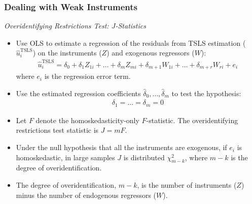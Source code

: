 \begin{frame}
\frametitle{Dealing with Weak Instruments}
\emph{Overidentifying Restrictions Test: $J$-Statistics}
\begin{itemize}
\item Use OLS to estimate a regression of the residuals from TSLS estimation ($\hat{u}^{\text{TSLS}}_{i}$) on the instruments ($Z$) and exogenous regressors ($W$):
\begin{align*}
\hat{u}^{\text{TSLS}}_{i} 
= \delta_{0} + \delta_{1}Z_{1i} + \ldots + \delta_{m}Z_{mi} + \delta_{m+1}W_{1i} + \ldots + \delta_{m+r}W_{ri} + e_{i}
\end{align*}
where $e_{i}$ is the regression error term. 
\item Use the estimated regression coefficients $\hat{\delta}_{0},\ldots,\hat{\delta}_{m}$ to test the hypothesis:
\begin{align*}
\delta_{1} = \ldots = \delta_{m} = 0
\end{align*}
\item Let $F$ denote the homoskedasticity-only $F$-statistic. The overidentifying restrictions test statistic is $J=mF$. 
\item Under the null hypothesis that all the instruments are exogenous, if $e_{i}$ is homoskedastic, in large samples $J$ is distributed $\chi^{2}_{m-k}$, where $m-k$ is the degree of overidentification.
\item The degree of overidentification, $m-k$, is the number of instruments ($Z$) minus the number of endogenous regressors ($W$).
\end{itemize}
\end{frame}
